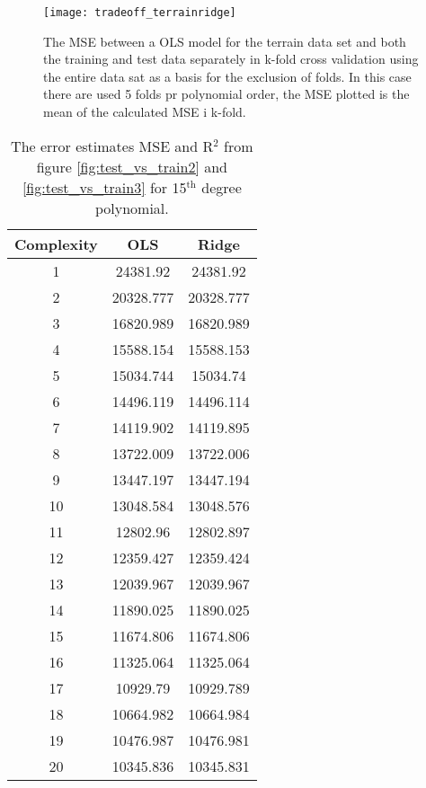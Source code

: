 \documentclass[uio,jmp,amsmath,amssymb,reprint,nofootinbib]{revtex4-1}
\numberwithin{equation}{section}
\begin{document}
\begin{figure}[H]
    \centering
    \texttt{[image: tradeoff\_terrainridge]}
    \caption{The MSE between a OLS model for the terrain data set and both the training and test data separately in k-fold cross validation using the entire data sat as a basis for the exclusion of folds. In this case there are used 5 folds pr polynomial order, the MSE plotted is the mean of the calculated MSE i k-fold.}
    \label{fig:test_vs_train2ridge}
\end{figure}

\begin{table}
\begin{tabular}{|c|c|c|}\hline
Complexity & OLS & Ridge\\ \hline
1 & 24381.92 & 24381.92 \\ \hline
2 & 20328.777 & 20328.777 \\ \hline
3 & 16820.989 & 16820.989 \\ \hline
4 & 15588.154 & 15588.153 \\ \hline
5 & 15034.744 & 15034.74 \\ \hline
6 & 14496.119 & 14496.114 \\ \hline
7 & 14119.902 & 14119.895 \\ \hline
8 & 13722.009 & 13722.006 \\ \hline
9 & 13447.197 & 13447.194 \\ \hline
10 & 13048.584 & 13048.576 \\ \hline
11 & 12802.96 & 12802.897 \\ \hline
12 & 12359.427 & 12359.424 \\ \hline
13 & 12039.967 & 12039.967 \\ \hline
14 & 11890.025 & 11890.025 \\ \hline
15 & 11674.806 & 11674.806 \\ \hline
16 & 11325.064 & 11325.064 \\ \hline
17 & 10929.79 & 10929.789 \\ \hline
18 & 10664.982 & 10664.984 \\ \hline
19 & 10476.987 & 10476.981 \\ \hline
20 & 10345.836 & 10345.831 \\ \hline
\end{tabular}
\caption{The error estimates MSE and R\(^2\) from figure \ref{fig:test_vs_train2} and \ref{fig:test_vs_train3} for 15\(^\text{th}\) degree polynomial.}
\label{tab:09}
\end{table}
\end{document}
